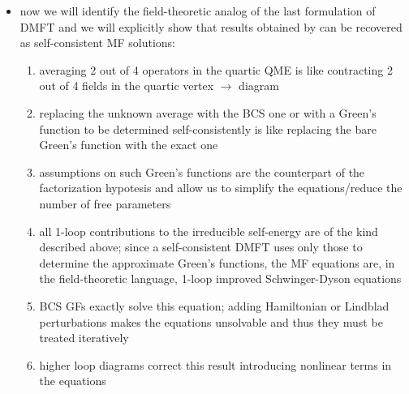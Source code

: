 \documentclass[a4paper,10pt]{article}
\theoremstyle{remark}
\begin{document}
\begin{itemize}
 \item now we will identify the field-theoretic analog of the last formulation of DMFT and we will explicitly show that results obtained by \cite{Bardyn2013} can be recovered as self-consistent MF solutions:
  \begin{enumerate}
   \item averaging 2 out of 4 operators in the quartic QME is like contracting 2 out of 4 fields in the quartic vertex $\rightarrow$ diagram
   \item replacing the unknown average with the BCS one or with a Green's function to be determined self-consistently is like replacing the bare Green's function with the exact one
   \item assumptions on such Green's functions are the counterpart of the factorization hypotesis and allow us to simplify the equations/reduce the number of free parameters
   \item all 1-loop contributions to the irreducible self-energy are of the kind described above; since a self-consistent DMFT uses only those to determine the approximate Green's functions, the MF equations are, in the field-theoretic language, 1-loop improved Schwinger-Dyson equations
   \item BCS GFs exactly solve this equation; adding Hamiltonian or Lindblad perturbations makes the equations unsolvable and thus they must be treated iteratively
   \item higher loop diagrams correct this result introducing nonlinear terms in the equations
  \end{enumerate}

\end{itemize}

 
 
 {}
   
\end{document}
